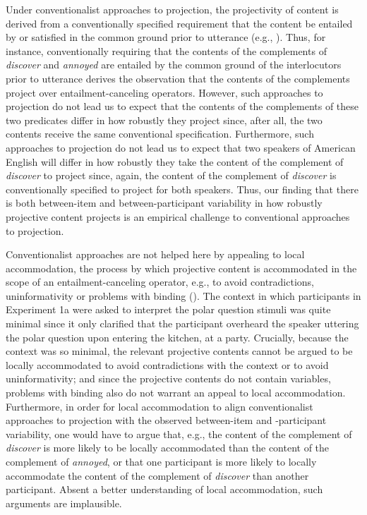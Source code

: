 \documentclass[11pt,fleqn]{article}
\newcommand{\6}{\mbox{$[\hspace*{-.6mm}[$}}
\newcommand{\9}{\mbox{$]\hspace*{-.6mm}]$}}
\begin{document}
Under conventionalist approaches to projection, the projectivity of content is derived from a conventionally specified requirement that the content be entailed by or satisfied in the common ground prior to utterance (e.g., \citealt{heim83,vds92}). Thus, for instance, conventionally requiring that the contents of the complements of {\em discover} and {\em annoyed} are entailed by the common ground of the interlocutors prior to utterance derives the observation that the contents of the complements project over entailment-canceling operators. However, such approaches to projection do not lead us to expect that the contents of the complements of these two predicates differ in how robustly they project since, after all, the two contents receive the same conventional specification. Furthermore, such approaches to projection do not lead us to expect that two speakers of American English will differ in how robustly they take the content of the complement of {\em discover} to project since, again, the content of the complement of {\em discover} is conventionally specified to project for both speakers. Thus, our finding that there is both between-item and between-participant variability in how robustly projective content projects is an empirical challenge to conventional approaches to projection.

Conventionalist approaches are not helped here by appealing to local accommodation, the process by which projective content is accommodated in the scope of an entailment-canceling operator, e.g., to avoid contradictions, uninformativity or problems with binding (\citealt{heim83,vds92}). The context in which participants in Experiment 1a were asked to interpret the polar question stimuli was quite minimal since it only clarified that the participant overheard the speaker uttering the polar question upon entering the kitchen, at a party. Crucially, because the context was so minimal, the relevant projective contents cannot be argued to be locally accommodated to avoid contradictions with the context or to avoid uninformativity; and since the projective contents do not contain variables, problems with binding also do not warrant an appeal to local accommodation. Furthermore, in order for local accommodation to align conventionalist approaches to projection with the observed between-item and -participant variability, one would have to argue that, e.g., the content of the complement of {\em discover} is more likely to be locally accommodated than the content of the complement of {\em annoyed}, or that one participant is more likely to locally accommodate the content of the complement of {\em discover} than another participant. Absent a better understanding of local accommodation, such arguments are implausible. 
\end{document}
